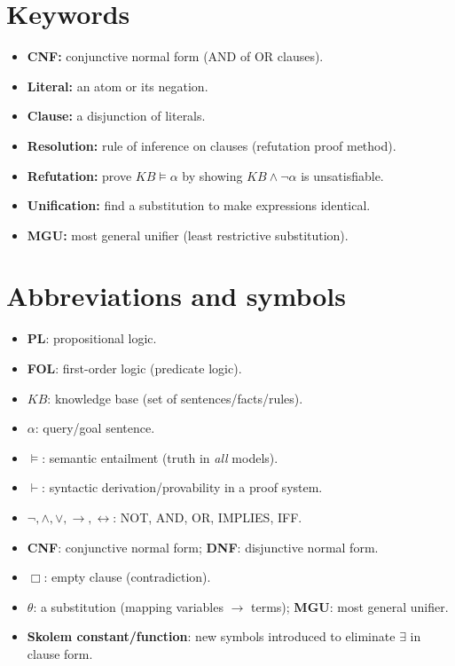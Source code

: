 \documentclass[11pt]{article}
\begin{document}
\section{Keywords}
\begin{itemize}[leftmargin=*]
  \item \textbf{CNF:} conjunctive normal form (AND of OR clauses).
  \item \textbf{Literal:} an atom or its negation.
  \item \textbf{Clause:} a disjunction of literals.
  \item \textbf{Resolution:} rule of inference on clauses (refutation proof method).
  \item \textbf{Refutation:} prove $KB \models \alpha$ by showing $KB \land \lnot\alpha$ is unsatisfiable.
  \item \textbf{Unification:} find a substitution to make expressions identical.
  \item \textbf{MGU:} most general unifier (least restrictive substitution).
\end{itemize}

\section{Abbreviations and symbols}
\begin{itemize}[leftmargin=*]
  \item \textbf{PL}: propositional logic.
  \item \textbf{FOL}: first-order logic (predicate logic).
  \item $KB$: knowledge base (set of sentences/facts/rules).
  \item $\alpha$: query/goal sentence.
  \item $\models$: semantic entailment (truth in \emph{all} models).
  \item $\vdash$: syntactic derivation/provability in a proof system.
  \item $\lnot,\land,\lor,\rightarrow,\leftrightarrow$: NOT, AND, OR, IMPLIES, IFF.
  \item \textbf{CNF}: conjunctive normal form; \textbf{DNF}: disjunctive normal form.
  \item $\Box$: empty clause (contradiction).
  \item $\theta$: a substitution (mapping variables $\rightarrow$ terms); \textbf{MGU}: most general unifier.
  \item \textbf{Skolem constant/function}: new symbols introduced to eliminate $\exists$ in clause form.
\end{itemize}
\end{document}

